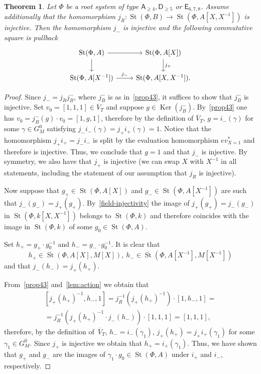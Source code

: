 \documentclass[10pt,a4paper,twoside]{article}
\newtheorem{theorem}{Theorem}
\theoremstyle{remark}
\theoremstyle{definition}
\numberwithin{lemma}{section}
\numberwithin{prop}{section}
\numberwithin{corollary}{section}
\numberwithin{externaltheorem}{section}
\DeclareMathOperator{\Ker}{Ker}
\DeclareMathOperator{\St}{St}
\newcommand{\inv}{^{-1}}
\newcommand{\rA}{\mathsf{A}}
\newcommand{\rD}{\mathsf{D}}
\newcommand{\rE}{\mathsf{E}}
\numberwithin{equation}{section}
\begin{document}
\begin{theorem} \label{thm:P1glueing}
 Let $\Phi$ be a root system of type $\rA_{\geq 4}, \rD_{\geq 5}$ or $\rE_{6,7,8}$.
 Assume additionally that the homomorphism $j_R \colon \St(\Phi, B) \to \St(\Phi, A[X, X\inv])$ is injective.  
 Then the homomorphism $j_-$ is injective and the following commutative square is pullback
 \[ \begin{tikzcd} \St(\Phi, A) \arrow{r} \arrow{d} & \St(\Phi, A[X]) \arrow{d}{j_+} \\ \St(\Phi, A[X\inv]) \arrow{r}{j_-} & \St(\Phi, A[X, X\inv]). \end{tikzcd} \] 
\end{theorem}
\begin{proof} Since $j_- = j_R j_B^-$, where $j_B^-$ is as in~\cref{prop43}, it suffices to show that $j_B^-$ is injective.
 Set $v_0 = [1, 1, 1] \in \overline{V}_T$ and suppose $g \in \Ker(j_B^-)$.
 By~\cref{prop43} one has $v_0 = j_B^-(g) \cdot v_0 = [1, g, 1]$, therefore by the definition of $\overline{V}_T$, $g = i_-(\gamma)$ for some $\gamma \in G_M^0$ satisfying $j_-i_-(\gamma) = j_+i_+(\gamma) = 1$.
 Notice that the homomorphism $j_+i_+ = j_-i_-$ is split by the evaluation homomorphism $ev_{X=1}^*$ and therefore is injective. Thus, we conclude that $g = 1$ and that $j_-$ is injective. By symmetry, we also have that $j_+$ is injective (we can swap $X$ with $X^{-1}$ in all statements, including the statement of our assumption that $j_R$ is injective).
 
 Now suppose that $g_+ \in \St(\Phi, A[X])$ and $g_- \in \St(\Phi, A[X\inv])$ are such that $j_-(g_-) = j_+(g_+)$.
 By~\cref{field-injectivity} the image of $j_+(g_+) = j_-(g_-)$ in $\St(\Phi, k[X, X\inv])$ belongs to $\St(\Phi, k)$ and therefore coincides with the image in $\St(\Phi, k)$ of some $g_0 \in \St(\Phi, A)$.
 
 Set $h_+ = g_+\cdot g_0^{-1}$ and $h_- = g_- \cdot g_0^{-1}$.
 It is clear that \[ h_+ \in \overline{\St}(\Phi, A[X], M[X]),\ h_- \in \overline{\St}(\Phi, A[X\inv], M[X\inv])\]
 and that $j_-(h_-) = j_+(h_+).$
 
 From~\cref{prop43} and~\cref{lem:action} we obtain that
 \begin{multline} \nonumber [j_+(h_+)^{-1}, h_-, 1] = j_R^{-1}(j_+(h_+)^{-1}) \cdot [1, h_-, 1] = \\ = j_R^{-1}(j_+(h_+)^{-1} \cdot j_-(h_-)) \cdot [1, 1, 1] = [1, 1, 1], \end{multline} therefore, by the definition of~$\overline{V}_T$, $h_- = i_-(\gamma_1)$, $j_+(h_+) = j_+i_+(\gamma_1)$ for some $\gamma_1 \in G_M^0$. Since $j_+$ is injective we obtain that $h_+ = i_+(\gamma_1)$. Thus, we have shown that $g_+$ and $g_-$ are the images of $\gamma_1 \cdot g_0 \in \St(\Phi, A)$ under $i_+$ and $i_-$, respectively.
 \end{proof}
  
\end{document}
